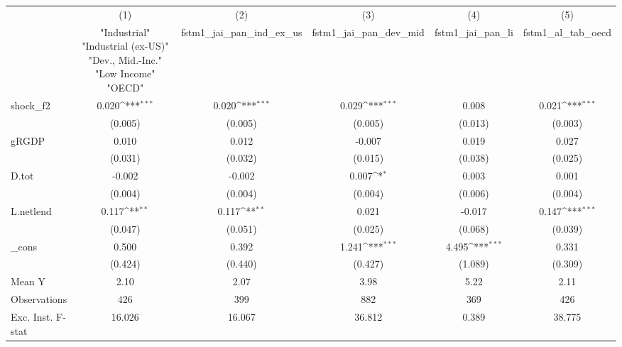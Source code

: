 {
\def\sym#1{\ifmmode^{#1}\else\(^{#1}\)\fi}
\begin{tabular}{l*{5}{c}}
\toprule
            &\multicolumn{1}{c}{(1)}&\multicolumn{1}{c}{(2)}&\multicolumn{1}{c}{(3)}&\multicolumn{1}{c}{(4)}&\multicolumn{1}{c}{(5)}\\
            &\multicolumn{1}{c}{ "Industrial" "Industrial (ex-US)" "Dev., Mid.-Inc." "Low Income" "OECD" }&\multicolumn{1}{c}{fstm1\_jai\_pan\_ind\_ex\_us}&\multicolumn{1}{c}{fstm1\_jai\_pan\_dev\_mid}&\multicolumn{1}{c}{fstm1\_jai\_pan\_li}&\multicolumn{1}{c}{fstm1\_al\_tab\_oecd}\\
\midrule
shock\_f2    &       0.020\sym{***}&       0.020\sym{***}&       0.029\sym{***}&       0.008         &       0.021\sym{***}\\
            &     (0.005)         &     (0.005)         &     (0.005)         &     (0.013)         &     (0.003)         \\
\addlinespace
gRGDP       &       0.010         &       0.012         &      -0.007         &       0.019         &       0.027         \\
            &     (0.031)         &     (0.032)         &     (0.015)         &     (0.038)         &     (0.025)         \\
\addlinespace
D.tot       &      -0.002         &      -0.002         &       0.007\sym{*}  &       0.003         &       0.001         \\
            &     (0.004)         &     (0.004)         &     (0.004)         &     (0.006)         &     (0.004)         \\
\addlinespace
L.netlend   &       0.117\sym{**} &       0.117\sym{**} &       0.021         &      -0.017         &       0.147\sym{***}\\
            &     (0.047)         &     (0.051)         &     (0.025)         &     (0.068)         &     (0.039)         \\
\addlinespace
\_cons      &       0.500         &       0.392         &       1.241\sym{***}&       4.495\sym{***}&       0.331         \\
            &     (0.424)         &     (0.440)         &     (0.427)         &     (1.089)         &     (0.309)         \\
\midrule
Mean Y      &        2.10         &        2.07         &        3.98         &        5.22         &        2.11         \\
Observations&         426         &         399         &         882         &         369         &         426         \\
Exc. Inst. F-stat&      16.026         &      16.067         &      36.812         &       0.389         &      38.775         \\
\bottomrule
\end{tabular}
}
